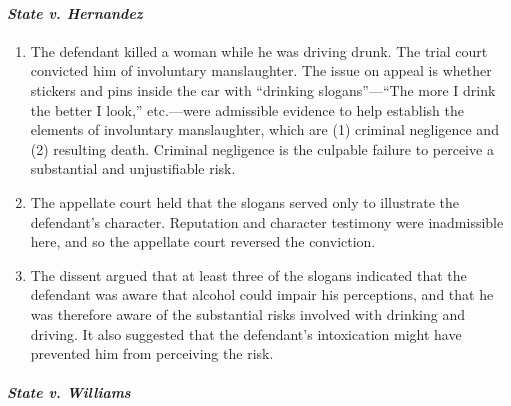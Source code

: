 \paragraph{\emph{State v. Hernandez}}

\begin{enumerate}
    \item The defendant killed a woman while he was driving drunk. The trial court convicted him of involuntary manslaughter. The issue on appeal is whether stickers and pins inside the car with ``drinking slogans''---``The more I drink the better I look,'' etc.---were admissible evidence to help establish the elements of involuntary manslaughter, which are (1) criminal negligence and (2) resulting death. Criminal negligence is the culpable failure to perceive a substantial and unjustifiable risk.
    \item The appellate court held that the slogans served only to illustrate the defendant's character. Reputation and character testimony were inadmissible here, and so the appellate court reversed the conviction.
    \item The dissent argued that at least three of the slogans indicated that the defendant was aware that alcohol could impair his perceptions, and that he was therefore aware of the substantial risks involved with drinking and driving. It also suggested that the defendant's intoxication might have prevented him from perceiving the risk.
\end{enumerate}

\paragraph{\emph{State v. Williams}}

